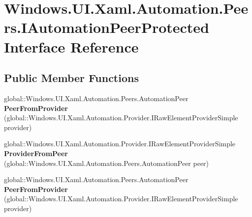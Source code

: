 \hypertarget{interface_windows_1_1_u_i_1_1_xaml_1_1_automation_1_1_peers_1_1_i_automation_peer_protected}{}\section{Windows.\+U\+I.\+Xaml.\+Automation.\+Peers.\+I\+Automation\+Peer\+Protected Interface Reference}
\label{interface_windows_1_1_u_i_1_1_xaml_1_1_automation_1_1_peers_1_1_i_automation_peer_protected}
\subsection*{Public Member Functions}
\begin{DoxyCompactItemize}
\item 
\mbox{\label{interface_windows_1_1_u_i_1_1_xaml_1_1_automation_1_1_peers_1_1_i_automation_peer_protected_a3cb5a538589736fee87b4e8736427c44}} 
global\+::\+Windows.\+U\+I.\+Xaml.\+Automation.\+Peers.\+Automation\+Peer {\bfseries Peer\+From\+Provider} (global\+::\+Windows.\+U\+I.\+Xaml.\+Automation.\+Provider.\+I\+Raw\+Element\+Provider\+Simple provider)
\item 
\mbox{\label{interface_windows_1_1_u_i_1_1_xaml_1_1_automation_1_1_peers_1_1_i_automation_peer_protected_a8d0f0c10723d5bd0c3717eb4b4179694}} 
global\+::\+Windows.\+U\+I.\+Xaml.\+Automation.\+Provider.\+I\+Raw\+Element\+Provider\+Simple {\bfseries Provider\+From\+Peer} (global\+::\+Windows.\+U\+I.\+Xaml.\+Automation.\+Peers.\+Automation\+Peer peer)
\item 
\mbox{\label{interface_windows_1_1_u_i_1_1_xaml_1_1_automation_1_1_peers_1_1_i_automation_peer_protected_a3cb5a538589736fee87b4e8736427c44}} 
global\+::\+Windows.\+U\+I.\+Xaml.\+Automation.\+Peers.\+Automation\+Peer {\bfseries Peer\+From\+Provider} (global\+::\+Windows.\+U\+I.\+Xaml.\+Automation.\+Provider.\+I\+Raw\+Element\+Provider\+Simple provider)
\item 
\mbox{\label{interface_windows_1_1_u_i_1_1_xaml_1_1_automation_1_1_peers_1_1_i_automation_peer_protected_a8d0f0c10723d5bd0c3717eb4b4179694}} 

\end{DoxyCompactItemize}
